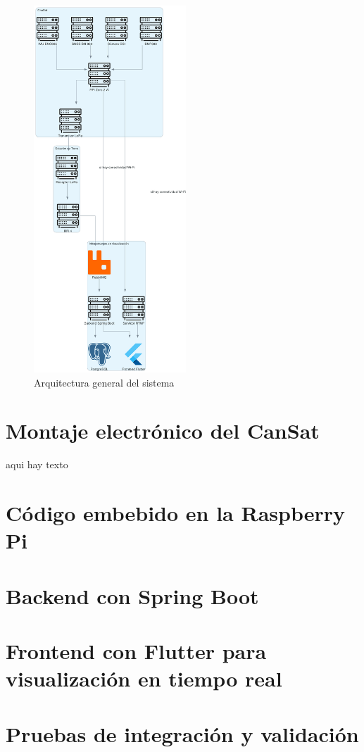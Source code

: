 \begin{figure}[H]
    \centering
    \includegraphics[width=0.51\textwidth]{Imagenes/Bitmap/cansat_architecture}
    \caption{Arquitectura general del sistema}
    \label{fig:cansat_architecture}
\end{figure}

\section{Montaje electrónico del CanSat}
aqui hay texto

\section{Código embebido en la Raspberry Pi}


\section{Backend con Spring Boot}


\section{Frontend con Flutter para visualización en tiempo real}


\section{Pruebas de integración y validación}

